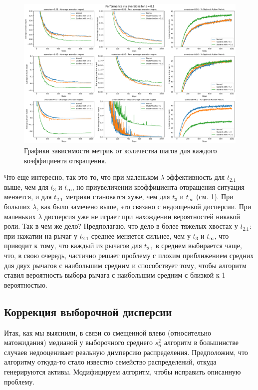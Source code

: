 \documentclass{article}
\begin{document}
\begin{figure}[h] %
\centering
\includegraphics[width=6in]{theory_tester/theory_images/epsilon_greedy/aversion_selected_aversions.png}
\caption{Графики зависимости метрик от количества шагов для каждого коэффициента отвращения.}
\label{fig:eps_greedy_aversion_selected_aversions}
\end{figure}

Что еще интересно, так это то, что при маленьком $\lambda$ эффективность для $t_{2.1}$ выше, чем для $t_3$ и $t_{\infty}$, но приувеличении коэффициента отвращения ситуация меняется, и  для $t_{2.1}$ метрики становятся хуже, чем для $t_3$ и $t_{\infty}$ (см. \ref{fig:eps_greedy_aversion_selected_aversions}). При больших $\lambda$, как было замечено выше, это связано с недооценкой дисперсии. При маленьких $\lambda$ дисперсия уже не играет при нахождении вероятностей никакой роли. Так в чем же дело? Предполагаю, что дело в более тяжелых хвостах у $t_{2.1}$: при нажатии на рычаг у $t_{2.1}$ среднее меняется сильнее, чем у $t_3$ и $t_{\infty}$, что приводит к тому, что каждый из рычагов для $t_{2.1}$ в среднем выбирается чаще, что, в свою очередь, частично решает проблему с плохим приближением средних для двух рычагов с наибольшим средним и способствует тому, чтобы алгоритм ставил вероятность выбора рычага с наибольшим средним с близкой к 1 вероятностью.

\subsection{Коррекция выборочной дисперсии}\label{sec:correction_eps_greedy}

Итак, как мы выяснили, в связи со смещенной влево (относительно матожидания) медианой у выборочного среднего $s_n^2$ алгоритм в большинстве случаев недооценивает реальную димперсию распределения. Предположим, что алгоритму откуда-то стало известно семейство распределений, откуда генерируются активы. Модифицируем алгоритм, чтобы исправить описанную проблему. \\
\end{document}
